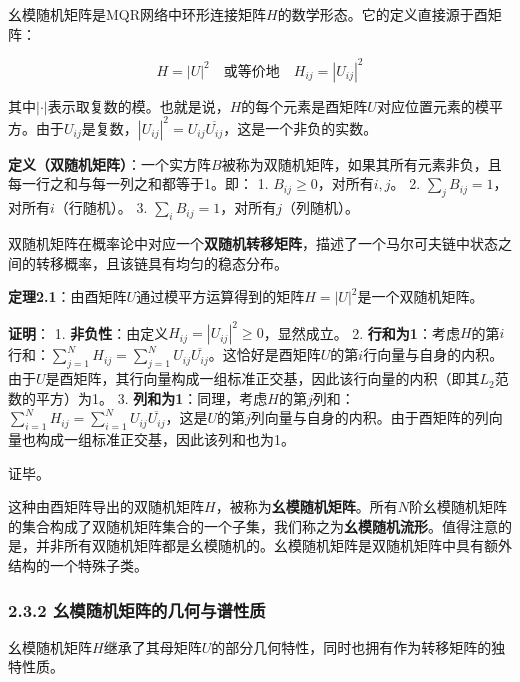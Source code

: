 \documentclass[
  12pt,
]{article}
\begin{document}
幺模随机矩阵是MQR网络中环形连接矩阵\(H\)的数学形态。它的定义直接源于酉矩阵：

\[
H = |U|^2 \quad \text{或等价地} \quad H_{ij} = |U_{ij}|^2
\]

其中\(|\cdot|\)表示取复数的模。也就是说，\(H\)的每个元素是酉矩阵\(U\)对应位置元素的模平方。由于\(U_{ij}\)是复数，\(|U_{ij}|^2 = U_{ij} \overline{U_{ij}}\)，这是一个非负的实数。

\textbf{定义（双随机矩阵）}：一个实方阵\(B\)被称为双随机矩阵，如果其所有元素非负，且每一行之和与每一列之和都等于1。即：
1. \(B_{ij} \ge 0\)，对所有\(i, j\)。 2.
\(\sum_{j} B_{ij} = 1\)，对所有\(i\)（行随机）。 3.
\(\sum_{i} B_{ij} = 1\)，对所有\(j\)（列随机）。

双随机矩阵在概率论中对应一个\textbf{双随机转移矩阵}，描述了一个马尔可夫链中状态之间的转移概率，且该链具有均匀的稳态分布。

\textbf{定理2.1}：由酉矩阵\(U\)通过模平方运算得到的矩阵\(H = |U|^2\)是一个双随机矩阵。

\textbf{证明}： 1.
\textbf{非负性}：由定义\(H_{ij} = |U_{ij}|^2 \ge 0\)，显然成立。 2.
\textbf{行和为1}：考虑\(H\)的第\(i\)行和：\(\sum_{j=1}^N H_{ij} = \sum_{j=1}^N U_{ij} \overline{U_{ij}}\)。这恰好是酉矩阵\(U\)的第\(i\)行向量与自身的内积。由于\(U\)是酉矩阵，其行向量构成一组标准正交基，因此该行向量的内积（即其\(L_2\)范数的平方）为1。
3.
\textbf{列和为1}：同理，考虑\(H\)的第\(j\)列和：\(\sum_{i=1}^N H_{ij} = \sum_{i=1}^N U_{ij} \overline{U_{ij}}\)，这是\(U\)的第\(j\)列向量与自身的内积。由于酉矩阵的列向量也构成一组标准正交基，因此该列和也为1。

证毕。

这种由酉矩阵导出的双随机矩阵\(H\)，被称为\textbf{幺模随机矩阵}。所有\(N\)阶幺模随机矩阵的集合构成了双随机矩阵集合的一个子集，我们称之为\textbf{幺模随机流形}。值得注意的是，并非所有双随机矩阵都是幺模随机的。幺模随机矩阵是双随机矩阵中具有额外结构的一个特殊子类。

\hypertarget{ux5e7aux6a21ux968fux673aux77e9ux9635ux7684ux51e0ux4f55ux4e0eux8c31ux6027ux8d28}{%
\subsubsection{2.3.2
幺模随机矩阵的几何与谱性质}\label{ux5e7aux6a21ux968fux673aux77e9ux9635ux7684ux51e0ux4f55ux4e0eux8c31ux6027ux8d28}}

幺模随机矩阵\(H\)继承了其母矩阵\(U\)的部分几何特性，同时也拥有作为转移矩阵的独特性质。
\end{document}

